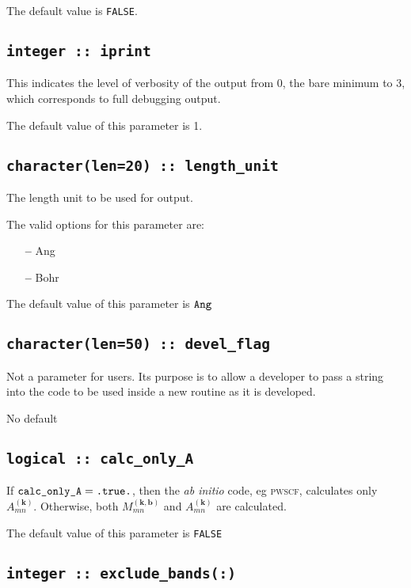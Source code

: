 The default value is \verb#FALSE#.


\subsection[iprint]{\tt integer :: iprint}

This indicates the level of verbosity of the output from 0,
the bare minimum to 3, which corresponds to full debugging output.

The default value of this parameter is 1.

\subsection[length\_unit]{\tt character(len=20) :: length\_unit}
The length unit to be used for output.

The valid options for this parameter are:
\begin{itemize}
\item[{\bf --}]  Ang
\item[{\bf --}]  Bohr
\end{itemize}

 The default value of this parameter is $\verb#Ang#$

\subsection[devel\_flag]{\tt character(len=50) :: devel\_flag}

Not a parameter for users. Its purpose is to allow a developer to pass a
string into the code to be used inside a new routine as it is developed.

No default

\subsection[calc\_only\_A]{\tt logical :: calc\_only\_A}

If $\verb#calc_only_A#=\verb#.true.#$, then the \textit{ab initio}
code, eg \textsc{pwscf},
calculates only $A_{mn}^{(\mathbf{k})}$. Otherwise, both
$M_{mn}^{(\mathbf{k,b})}$ and $A_{mn}^{(\mathbf{k})}$ are
calculated.

The default value of this parameter is \verb#FALSE#


\subsection[exclude\_bands]{\tt integer :: exclude\_bands(:)}

